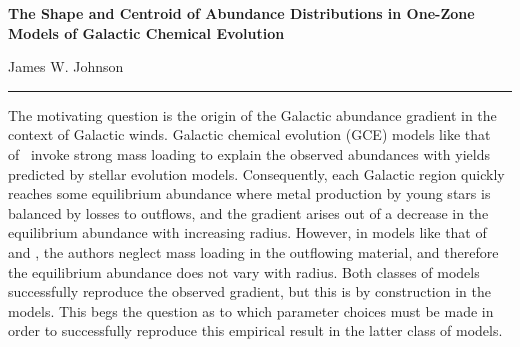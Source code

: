\documentclass[12pt]{article}
\begin{document}
\begin{center}
{\Large \textbf{The Shape and Centroid of Abundance Distributions in One-Zone
Models of Galactic Chemical Evolution}
\par\null\par
James W. Johnson
}
\par\null\par
\rule[0.7\baselineskip]{0.5\textwidth}{0.4pt}
\end{center}

\par\noindent
The motivating question is the origin of the Galactic abundance gradient in the
context of Galactic winds.
Galactic chemical evolution (GCE) models like that of~\citet{Johnson2021}
invoke strong mass loading to explain the observed abundances with yields
predicted by stellar evolution models.
Consequently, each Galactic region quickly reaches some equilibrium abundance
where metal production by young stars is balanced by losses to outflows, and
the gradient arises out of a decrease in the equilibrium abundance with
increasing radius.
However, in models like that of~\citet*{Minchev2013, Minchev2014} and
\citet{Spitoni2019}, the authors neglect mass loading in the outflowing
material, and therefore the equilibrium abundance does not vary with radius.
Both classes of models successfully reproduce the observed gradient, but this
is by construction in the~\citet{Johnson2021} models.
This begs the question as to which parameter choices must be made in order to
successfully reproduce this empirical result in the latter class of models.
\end{document}
